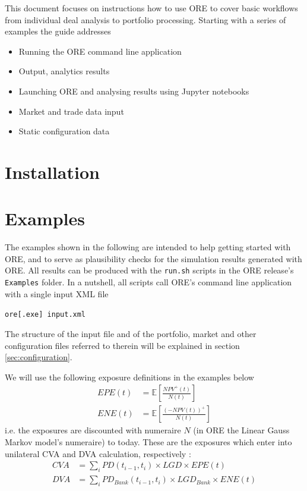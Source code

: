 \documentclass[12pt, a4paper]{article}
\newcommand\E{\ensuremath{\mathbb{E}}}
\newcommand{\CVA}{\mathit{CVA}}
\newcommand{\DVA}{\mathit{DVA}}
\newcommand{\EPE}{\mathit{EPE}}
\newcommand{\ENE}{\mathit{ENE}}
\newcommand{\PD}{\mathit{PD}}
\newcommand{\LGD}{\mathit{LGD}}
\begin{document}
\vspace{1em}

This document focuses on instructions how to use ORE to cover basic workflows from individual deal analysis to portfolio processing. Starting with a series of examples the guide addresses
\begin{itemize}
\setlength{\itemsep}{0pt}
\item Running the ORE command line application 
\item Output, analytics results
\item Launching ORE and analysing results using Jupyter notebooks 
\item Market and trade data input
\item Static configuration data
\end{itemize}

\newpage

\section{Installation}

\section{Examples}\label{sec:examples}

The examples shown in the following are intended to help getting started with ORE, and to serve as plausibility checks for the simulation results generated with ORE.
All results can be produced with the {\tt run.sh} scripts in the ORE release's {\tt Examples} folder. In a nutshell, all scripts call ORE's command line application with a single input XML file

\medskip
\centerline{\tt ore[.exe] input.xml}
\medskip

The structure of the input file and of the portfolio, market and other configuration files referred to therein will be explained in section \ref{sec:configuration}. 

\medskip
We will use the following exposure definitions in the examples below
\begin{align*}
\EPE(t) &= \E\left[ \frac{NPV^+(t)}{N(t)} \right] \\
\ENE(t) &= \E\left[ \frac{(-NPV(t))^+}{N(t)} \right]
\end{align*}
i.e. the exposures are discounted with numeraire $N$ (in ORE the Linear Gauss Markov model's numeraire) to today. These are the exposures which enter into unilateral CVA and DVA calculation, respectively \cite{Lichters}:
\begin{align*}
\CVA &= \sum_{i} \PD(t_{i-1},t_i)\times\LGD\times \EPE(t) \\
\DVA &= \sum_{i} \PD_{Bank}(t_{i-1},t_i)\times\LGD_{Bank}\times \ENE(t)
\end{align*}
\end{document}
